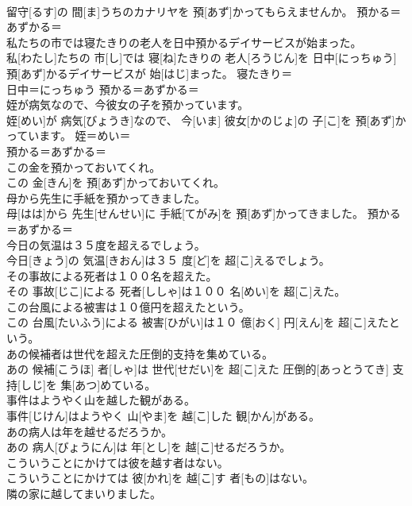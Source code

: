 \documentclass[8pt]{extreport}
\begin{document}
\begin{CJK}{UTF8}{min}
\\	留守[るす]の 間[ま]うちのカナリヤを 預[あず]かってもらえませんか。	預かる＝あずかる＝ 
\\	私たちの市では寝たきりの老人を日中預かるデイサービスが始まった。	
\\	私[わたし]たちの 市[し]では 寝[ね]たきりの 老人[ろうじん]を 日中[にっちゅう] 預[あず]かるデイサービスが 始[はじ]まった。	寝たきり＝ 
\\	日中＝にっちゅう 預かる＝あずかる＝ 
\\	姪が病気なので、今彼女の子を預かっています。	
\\	姪[めい]が 病気[びょうき]なので、 今[いま] 彼女[かのじょ]の 子[こ]を 預[あず]かっています。	姪＝めい＝ 
\\	預かる＝あずかる＝ 
\\	この金を預かっておいてくれ。	
\\	この 金[きん]を 預[あず]かっておいてくれ。	
\\	母から先生に手紙を預かってきました。	
\\	母[はは]から 先生[せんせい]に 手紙[てがみ]を 預[あず]かってきました。	預かる＝あずかる＝ 
\\	今日の気温は３５度を超えるでしょう。	
\\	今日[きょう]の 気温[きおん]は３５ 度[ど]を 超[こ]えるでしょう。	
\\	その事故による死者は１００名を超えた。	
\\	その 事故[じこ]による 死者[ししゃ]は１００ 名[めい]を 超[こ]えた。	
\\	この台風による被害は１０億円を超えたという。	
\\	この 台風[たいふう]による 被害[ひがい]は１０ 億[おく] 円[えん]を 超[こ]えたという。	
\\	あの候補者は世代を超えた圧倒的支持を集めている。	
\\	あの 候補[こうほ] 者[しゃ]は 世代[せだい]を 超[こ]えた 圧倒的[あっとうてき] 支持[しじ]を 集[あつ]めている。	
\\	事件はようやく山を越した観がある。	
\\	事件[じけん]はようやく 山[やま]を 越[こ]した 観[かん]がある。	
\\	あの病人は年を越せるだろうか。	
\\	あの 病人[びょうにん]は 年[とし]を 越[こ]せるだろうか。	
\\	こういうことにかけては彼を越す者はない。	
\\	こういうことにかけては 彼[かれ]を 越[こ]す 者[もの]はない。	
\\	隣の家に越してまいりました。	

\end{CJK}
\end{document}
